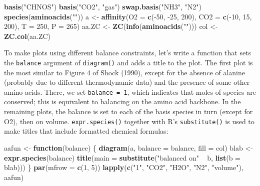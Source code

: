 \documentclass[]{tufte-handout}
\newenvironment{Shaded}{}{}
\newcommand{\KeywordTok}[1]{\textcolor[rgb]{0.00,0.44,0.13}{\textbf{#1}}}
\newcommand{\DataTypeTok}[1]{\textcolor[rgb]{0.56,0.13,0.00}{#1}}
\newcommand{\DecValTok}[1]{\textcolor[rgb]{0.25,0.63,0.44}{#1}}
\newcommand{\StringTok}[1]{\textcolor[rgb]{0.25,0.44,0.63}{#1}}
\newcommand{\ControlFlowTok}[1]{\textcolor[rgb]{0.00,0.44,0.13}{\textbf{#1}}}
\newcommand{\OperatorTok}[1]{\textcolor[rgb]{0.40,0.40,0.40}{#1}}
\newcommand{\NormalTok}[1]{#1}
\begin{document}
\begin{Shaded}
\begin{Highlighting}[]
\KeywordTok{basis}\NormalTok{(}\StringTok{"CHNOS"}\NormalTok{)}
\KeywordTok{basis}\NormalTok{(}\StringTok{"CO2"}\NormalTok{, }\StringTok{"gas"}\NormalTok{)}
\KeywordTok{swap.basis}\NormalTok{(}\StringTok{"NH3"}\NormalTok{, }\StringTok{"N2"}\NormalTok{)}
\KeywordTok{species}\NormalTok{(}\KeywordTok{aminoacids}\NormalTok{(}\StringTok{""}\NormalTok{))}
\NormalTok{a <-}\StringTok{ }\KeywordTok{affinity}\NormalTok{(}\DataTypeTok{O2 =} \KeywordTok{c}\NormalTok{(}\OperatorTok{-}\DecValTok{50}\NormalTok{, }\OperatorTok{-}\DecValTok{25}\NormalTok{, }\DecValTok{200}\NormalTok{), }\DataTypeTok{CO2 =} \KeywordTok{c}\NormalTok{(}\OperatorTok{-}\DecValTok{10}\NormalTok{, }\DecValTok{15}\NormalTok{, }\DecValTok{200}\NormalTok{), }\DataTypeTok{T =} \DecValTok{250}\NormalTok{, }\DataTypeTok{P =} \DecValTok{265}\NormalTok{)}
\NormalTok{aa.ZC <-}\StringTok{ }\KeywordTok{ZC}\NormalTok{(}\KeywordTok{info}\NormalTok{(}\KeywordTok{aminoacids}\NormalTok{(}\StringTok{""}\NormalTok{)))}
\NormalTok{col <-}\StringTok{ }\KeywordTok{ZC.col}\NormalTok{(aa.ZC)}
\end{Highlighting}
\end{Shaded}

To make plots using different balance constraints, let's write a
function that sets the \texttt{balance} argument of {\texttt{diagram()}}
and adds a title to the plot. The first plot is the most similar to
Figure 4 of Shock (1990), except for the absence of alanine (probably
due to different thermodynamic data) and the presence of some other
amino acids. There, we set \texttt{balance\ =\ 1}, which indicates that
moles of species are conserved; this is equivalent to balancing on the
amino acid backbone. In the remaining plots, the balance is set to each
of the basis species in turn (except for O2), then on volume.
{\texttt{expr.species()}} together with R's \texttt{substitute()} is
used to make titles that include formatted chemical formulas:

\begin{Shaded}
\begin{Highlighting}[]
\NormalTok{aafun <-}\StringTok{ }\ControlFlowTok{function}\NormalTok{(balance) \{}
  \KeywordTok{diagram}\NormalTok{(a, }\DataTypeTok{balance =}\NormalTok{ balance, }\DataTypeTok{fill =}\NormalTok{ col)}
\NormalTok{  blab <-}\StringTok{ }\KeywordTok{expr.species}\NormalTok{(balance)}
  \KeywordTok{title}\NormalTok{(}\DataTypeTok{main =} \KeywordTok{substitute}\NormalTok{(}\StringTok{"balanced on"} \OperatorTok{~}\StringTok{ }\NormalTok{b, }\KeywordTok{list}\NormalTok{(}\DataTypeTok{b =}\NormalTok{ blab)))}
\NormalTok{\}}
\KeywordTok{par}\NormalTok{(}\DataTypeTok{mfrow =} \KeywordTok{c}\NormalTok{(}\DecValTok{1}\NormalTok{, }\DecValTok{5}\NormalTok{))}
\KeywordTok{lapply}\NormalTok{(}\KeywordTok{c}\NormalTok{(}\StringTok{"1"}\NormalTok{, }\StringTok{"CO2"}\NormalTok{, }\StringTok{"H2O"}\NormalTok{, }\StringTok{"N2"}\NormalTok{, }\StringTok{"volume"}\NormalTok{), aafun)}
\end{Highlighting}
\end{Shaded}
\end{document}
